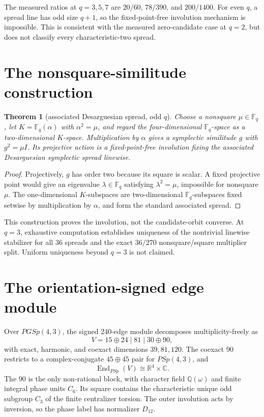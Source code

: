 \documentclass[11pt]{article}
\newtheorem{theorem}{Theorem}
\begin{document}
The measured ratios at \(q=3,5,7\) are \(20/60\), \(78/390\), and
\(200/1400\). For even \(q\), a spread line has odd size \(q+1\), so the
fixed-point-free involution mechanism is impossible. This is consistent with the
measured zero-candidate case at \(q=2\), but does not classify every
characteristic-two spread.

\section{The nonsquare-similitude construction}
\begin{theorem}[associated Desarguesian spread, odd \(q\)]
Choose a nonsquare \(\mu\in\mathbb F_q\), let
\(K=\mathbb F_q(\alpha)\) with \(\alpha^2=\mu\), and regard the four-dimensional
\(\mathbb F_q\)-space as a two-dimensional \(K\)-space. Multiplication by
\(\alpha\) gives a symplectic similitude \(g\) with \(g^2=\mu I\). Its
projective action is a fixed-point-free involution fixing the associated
Desarguesian symplectic spread linewise.
\end{theorem}

\begin{proof}
Projectively, \(g\) has order two because its square is scalar. A fixed projective
point would give an eigenvalue \(\lambda\in\mathbb F_q\) satisfying
\(\lambda^2=\mu\), impossible for nonsquare \(\mu\). The one-dimensional
\(K\)-subspaces are two-dimensional \(\mathbb F_q\)-subspaces fixed setwise by
multiplication by \(\alpha\), and form the standard associated spread.
\end{proof}

This construction proves the involution, not the candidate-orbit converse. At
\(q=3\), exhaustive computation establishes uniqueness of the nontrivial
linewise stabilizer for all 36 spreads and the exact \(36/270\)
nonsquare/square multiplier split. Uniform uniqueness beyond \(q=3\) is not
claimed.

\section{The orientation-signed edge module}
Over \(PGSp(4,3)\), the signed 240-edge module decomposes multiplicity-freely as
\[
 V=15\oplus24\mid81\mid30\oplus90,
\]
with exact, harmonic, and coexact dimensions \(39,81,120\). The coexact 90
restricts to a complex-conjugate \(45\oplus\overline{45}\) pair for
\(PSp(4,3)\), and
\[
 \operatorname{End}_{PSp}(V)\cong\mathbb R^4\times\mathbb C.
\]
The 90 is the only non-rational block, with character field
\(\mathbb Q(\omega)\) and finite integral phase units \(C_6\). Its square
contains the characteristic unique odd subgroup \(C_3\) of the finite
centralizer torsion. The outer involution acts by inversion, so the phase label
has normalizer \(D_{12}\).
\end{document}
